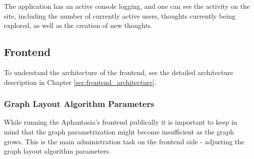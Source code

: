 The application has an active console logging, and one can see the activity on the site, including the number of currently active users,
thoughts currently being explored, as well as the creation of new thoughts.

\subsection{Frontend}
To understand the architecture of the frontend, see the detailed architecture description in Chapter \ref{sec:frontend_architecture}.


\subsubsection{Graph Layout Algorithm Parameters}
While running the Aphantasia's frontend publically it is important to keep in mind that the graph parametrization might become insufficient as the graph grows.
This is the main administration task on the frontend side - adjusting the graph layout algorithm parameters.

